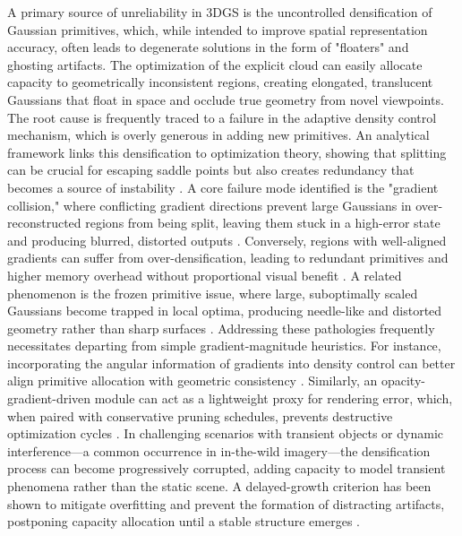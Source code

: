 \documentclass[11pt,a4paper]{article}
\begin{document}
A primary source of unreliability in 3DGS is the uncontrolled densification of Gaussian primitives, which, while intended to improve spatial representation accuracy, often leads to degenerate solutions in the form of "floaters" and ghosting artifacts. The optimization of the explicit cloud can easily allocate capacity to geometrically inconsistent regions, creating elongated, translucent Gaussians that float in space and occlude true geometry from novel viewpoints. The root cause is frequently traced to a failure in the adaptive density control mechanism, which is overly generous in adding new primitives. An analytical framework links this densification to optimization theory, showing that splitting can be crucial for escaping saddle points but also creates redundancy that becomes a source of instability \cite{arxiv:2505.05587v1}. A core failure mode identified is the "gradient collision," where conflicting gradient directions prevent large Gaussians in over-reconstructed regions from being split, leaving them stuck in a high-error state and producing blurred, distorted outputs \cite{arxiv:2404.10484v1}. Conversely, regions with well-aligned gradients can suffer from over-densification, leading to redundant primitives and higher memory overhead without proportional visual benefit \cite{arxiv:2508.09239v2}. A related phenomenon is the frozen primitive issue, where large, suboptimally scaled Gaussians become trapped in local optima, producing needle-like and distorted geometry rather than sharp surfaces \cite{arxiv:2510.19653v1}. Addressing these pathologies frequently necessitates departing from simple gradient-magnitude heuristics. For instance, incorporating the angular information of gradients into density control can better align primitive allocation with geometric consistency \cite{arxiv:2510.26921v1}. Similarly, an opacity-gradient-driven module can act as a lightweight proxy for rendering error, which, when paired with conservative pruning schedules, prevents destructive optimization cycles \cite{arxiv:2510.10257v1}. In challenging scenarios with transient objects or dynamic interference---a common occurrence in in-the-wild imagery---the densification process can become progressively corrupted, adding capacity to model transient phenomena rather than the static scene. A delayed-growth criterion has been shown to mitigate overfitting and prevent the formation of distracting artifacts, postponing capacity allocation until a stable structure emerges \cite{arxiv:2506.02751v3,arxiv:2512.04815v1}.
\end{document}
